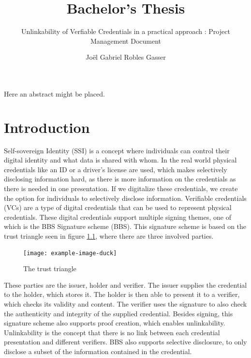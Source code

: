 \documentclass[
	a4paper               %
	,bibliography=totoc   %
	,listof=totoc         %
	,monolingual
	twoside=false,
]{bfhthesis}              %
\begin{document}
\frontmatter

\title{Bachelor's Thesis}
\subtitle{Unlinkability of Verfiable Credentials in a practical approach
: Project Management Document}
\author{Joël Gabriel Robles Gasser}

\maketitle

Here an abstract might be placed.


\tableofcontents

\mainmatter

\chapter{Introduction}
Self-sovereign Identity (SSI)\cite{self-sovereign-identity} is a concept where individuals can control their digital identity and what data is shared with whom.
In the real world physical credentials like an ID or a driver's license are used, which makes selectively disclosing information hard, as there is more information on the credentials as there is needed in one presentation.
If we digitalize these credentials, we create the option for individuals to selectively disclose information. 
Verifiable credentials (VCs)\cite{verifiable-credentials} are a type of digital credentials that can be used to represent physical credentials.
These digital credentials support multiple signing themes, one of which is the BBS Signature scheme (BBS)\cite{bbs-signature-scheme}.
This signature scheme is based on the trust triangle seen in figure \ref{fig:trusttringle}, where there are three involved parties.

\begin{figure}[h]
	\centering
	\texttt{[image: example-image-duck]}
	\caption{The trust triangle}
	\label{fig:trusttringle}
\end{figure}

These parties are the issuer, holder and verifier.
The issuer supplies the credential to the holder, which stores it. The holder is then able to present it to a verifier, which checks its validity and content.
The verifier uses the signature to also check the authenticity and integrity of the supplied credential.
Besides signing, this signature scheme also supports proof creation, which enables unlinkability.
Unlinkability is the concept that there is no link between each credential presentation and different verifiers.
BBS also supports selective disclosure, to only disclose a subset of the information contained in the credential.\\
\end{document}
